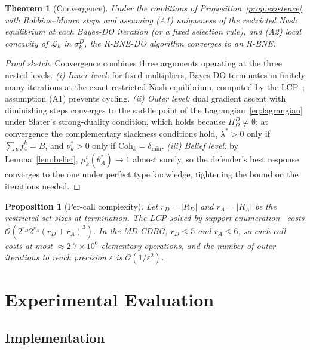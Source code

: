 \documentclass[conference]{IEEEtran}
\newtheorem{theorem}{Theorem}
\newtheorem{proposition}{Proposition}
\newcommand{\Coh}{\mathrm{Coh}}
\begin{document}
\begin{theorem}[Convergence]\label{thm:conv}
Under the conditions of Proposition~\ref{prop:existence}, with Robbins--Monro
steps and assuming (A1) uniqueness of the restricted Nash equilibrium at each
Bayes-DO iteration (or a fixed selection rule), and (A2) local concavity of
$\mathcal{L}_k$ in $\sigma_k^D$, the R-BNE-DO algorithm converges to an R-BNE.
\end{theorem}

\begin{proof}[Proof sketch]
Convergence combines three arguments operating at the three nested levels.
\emph{(i) Inner level:} for fixed multipliers, Bayes-DO terminates in finitely
many iterations at the exact restricted Nash equilibrium, computed by the
LCP~\cite{lemke1964}; assumption (A1) prevents cycling. \emph{(ii) Outer level:}
dual gradient ascent with diminishing steps converges to the saddle point of the
Lagrangian~\eqref{eq:lagrangian} under Slater's strong-duality condition, which
holds because $\Pi^D_\Omega\neq\emptyset$; at convergence the complementary
slackness conditions hold, $\lambda^*>0$ only if $\sum_k f_4^k=B$, and
$\nu_k^*>0$ only if $\Coh_k=\delta_{\min}$. \emph{(iii) Belief level:} by
Lemma~\ref{lem:belief}, $\mu_k^t(\theta_A^*)\to1$ almost surely, so the
defender's best response converges to the one under perfect type knowledge,
tightening the bound on the iterations needed.
\end{proof}

\begin{proposition}[Per-call complexity]
\label{prop:complexity}
Let $r_D=|R_D|$ and $r_A=|R_A|$ be the restricted-set sizes at termination.
The LCP solved by support enumeration~\cite{porter2008} costs
$\mathcal{O}(2^{r_D}2^{r_A}(r_D+r_A)^3)$. In the MD-CDBG, $r_D\leq5$ and
$r_A\leq6$, so each call costs at most $\approx2.7\times10^6$ elementary
operations, and the number of outer iterations to reach precision $\varepsilon$
is $\mathcal{O}(1/\varepsilon^2)$.
\end{proposition}

\section{Experimental Evaluation}
\label{sec:results}

\subsection{Implementation}
\end{document}
